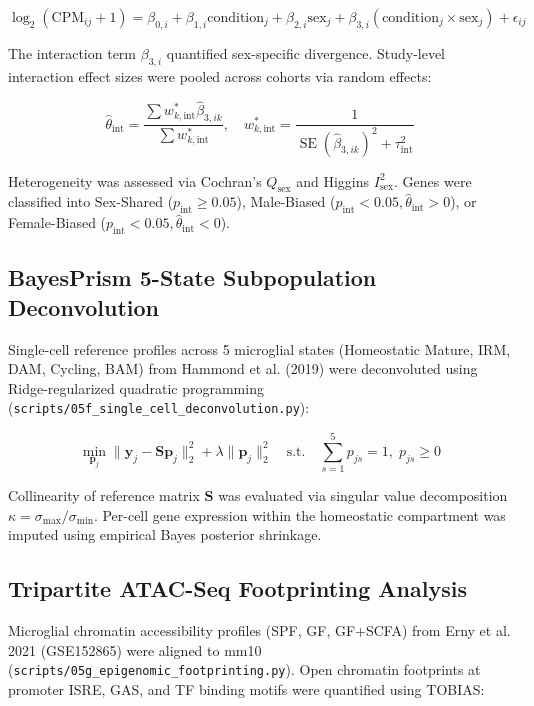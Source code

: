 \documentclass[10pt,a4paper]{article}
\begin{document}
\begin{equation}
\log_2(\text{CPM}_{ij} + 1) = \beta_{0,i} + \beta_{1,i}\text{condition}_j + \beta_{2,i}\text{sex}_j + \beta_{3,i}(\text{condition}_j \times \text{sex}_j) + \epsilon_{ij}
\end{equation}

The interaction term $\beta_{3,i}$ quantified sex-specific divergence. Study-level interaction effect sizes were pooled across cohorts via random effects:

\begin{equation}
\hat{\theta}_{\text{int}} = \frac{\sum w_{k,\text{int}}^* \hat{\beta}_{3,ik}}{\sum w_{k,\text{int}}^*}, \quad w_{k,\text{int}}^* = \frac{1}{\operatorname{SE}(\hat{\beta}_{3,ik})^2 + \tau_{\text{int}}^2}
\end{equation}

Heterogeneity was assessed via Cochran's $Q_{\text{sex}}$ and Higgins $I^2_{\text{sex}}$. Genes were classified into Sex-Shared ($p_{\text{int}} \ge 0.05$), Male-Biased ($p_{\text{int}} < 0.05, \hat{\theta}_{\text{int}} > 0$), or Female-Biased ($p_{\text{int}} < 0.05, \hat{\theta}_{\text{int}} < 0$).

\subsection{BayesPrism 5-State Subpopulation Deconvolution}
Single-cell reference profiles across 5 microglial states (Homeostatic Mature, IRM, DAM, Cycling, BAM) from Hammond et al. (2019) were deconvoluted using Ridge-regularized quadratic programming (\texttt{\small scripts/05f\_single\_cell\_deconvolution.py}):

\begin{equation}
\min_{\mathbf{p}_j} \|\mathbf{y}_j - \mathbf{S}\mathbf{p}_j\|_2^2 + \lambda \|\mathbf{p}_j\|_2^2 \quad \text{s.t.} \quad \sum_{s=1}^5 p_{js} = 1, \; p_{js} \ge 0
\end{equation}

Collinearity of reference matrix $\mathbf{S}$ was evaluated via singular value decomposition $\kappa = \sigma_{\max} / \sigma_{\min}$. Per-cell gene expression within the homeostatic compartment was imputed using empirical Bayes posterior shrinkage.

\subsection{Tripartite ATAC-Seq Footprinting Analysis}
Microglial chromatin accessibility profiles (SPF, GF, GF+SCFA) from Erny et al. 2021 (GSE152865) were aligned to mm10 (\texttt{\small scripts/05g\_epigenomic\_footprinting.py}). Open chromatin footprints at promoter ISRE, GAS, and TF binding motifs were quantified using TOBIAS:
\end{document}
